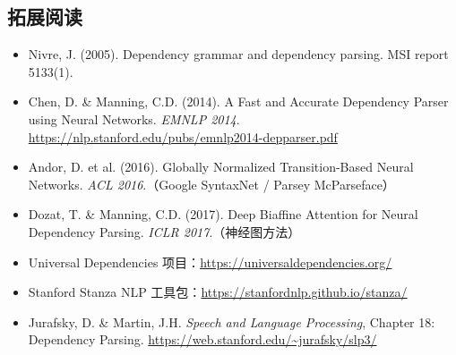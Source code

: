 \subsection{拓展阅读}

\begin{itemize}
    \item Nivre, J. (2005). Dependency grammar and dependency parsing. MSI report 5133(1).
    \item Chen, D. \& Manning, C.D. (2014). A Fast and Accurate Dependency Parser using Neural Networks. \textit{EMNLP 2014}. \url{https://nlp.stanford.edu/pubs/emnlp2014-depparser.pdf}
    \item Andor, D. et al. (2016). Globally Normalized Transition-Based Neural Networks. \textit{ACL 2016}.（Google SyntaxNet / Parsey McParseface）
    \item Dozat, T. \& Manning, C.D. (2017). Deep Biaffine Attention for Neural Dependency Parsing. \textit{ICLR 2017}.（神经图方法）
    \item Universal Dependencies 项目：\url{https://universaldependencies.org/}
    \item Stanford Stanza NLP 工具包：\url{https://stanfordnlp.github.io/stanza/}
    \item Jurafsky, D. \& Martin, J.H. \textit{Speech and Language Processing}, Chapter 18: Dependency Parsing. \url{https://web.stanford.edu/~jurafsky/slp3/}
\end{itemize}


